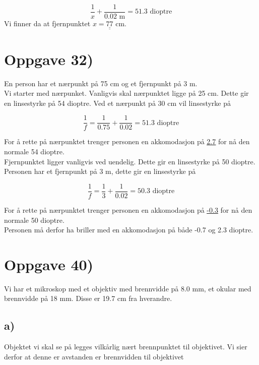 \documentclass[a4paper,norsk, 10pt]{article}
\begin{document}
\begin{equation}
\frac{1}{x} + \frac{1}{0.02 \text{ m}} = 51.3 \text{ dioptre}
\end{equation}
Vi finner da at fjernpunktet $x = \underline{\underline{77}}$ cm.


\section*{Oppgave 32)}
En person har et nærpunkt på 75 cm og et fjernpunkt på 3 m.\\

Vi starter med nærpunket. Vanligvis skal nærpunktet ligge på 25 cm. Dette gir en linsestyrke på 54 dioptre. Ved et nærpunkt på 30 cm vil linsestyrke på

\begin{equation}
\frac{1}{f} = \frac{1}{0.75} + \frac{1}{0.02} = 51.3 \text{ dioptre}
\end{equation}

For å rette på nærpunktet trenger personen en akkomodasjon på \underline{\underline{2.7}} for nå den normale 54 dioptre.\\

Fjernpunktet ligger vanligvis ved uendelig. Dette gir en linsestyrke på 50 dioptre. Personen har et fjernpunkt på 3 m, dette gir en linsestyrke på

\begin{equation}
\frac{1}{f} = \frac{1}{3} + \frac{1}{0.02} = 50.3 \text{ dioptre} 
\end{equation}

For å rette på nærpunktet trenger personen en akkomodasjon på \underline{\underline{-0.3}} for nå den normale 50 dioptre.\\

Personen må derfor ha briller med en akkomodasjon på både -0.7 og 2.3 dioptre.

\section*{Oppgave 40)}

Vi har et mikroskop med et objektiv med brennvidde på 8.0 mm, et okular med brennvidde på 18 mm. Disse er 19.7 cm fra hverandre.

\subsection*{a)}

Objektet vi skal se på legges vilkårlig nært brennpunktet til objektivet. Vi sier derfor at denne er avstanden er brennvidden til objektivet
\end{document}
